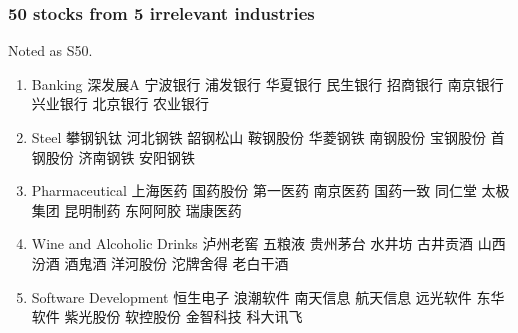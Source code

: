 \documentclass[12pt,a4paper]{article}
\begin{document}
\begin{CJK*}{UTF8}{song}
\subsubsection{50 stocks from 5 irrelevant industries}
Noted as S50.
\begin{multicols}{2}
\begin{enumerate}
\item Banking
 深发展A
 宁波银行
 浦发银行
 华夏银行
 民生银行
 招商银行
 南京银行
 兴业银行
 北京银行
 农业银行
\item Steel
 攀钢钒钛
 河北钢铁
 韶钢松山
 鞍钢股份
 华菱钢铁
 南钢股份
 宝钢股份
 首钢股份
 济南钢铁
 安阳钢铁
\item Pharmaceutical
 上海医药
 国药股份
 第一医药
 南京医药
 国药一致
 同仁堂
 太极集团
 昆明制药
 东阿阿胶
 瑞康医药
\item Wine and Alcoholic Drinks
 泸州老窖
 五粮液
 贵州茅台
 水井坊
 古井贡酒
 山西汾酒
 酒鬼酒
 洋河股份
 沱牌舍得
 老白干酒
\item Software Development
 恒生电子
 浪潮软件
 南天信息
 航天信息
 远光软件
 东华软件
 紫光股份
 软控股份
 金智科技
 科大讯飞
\end{enumerate}
\end{multicols}


\end{CJK*}
\end{document}
